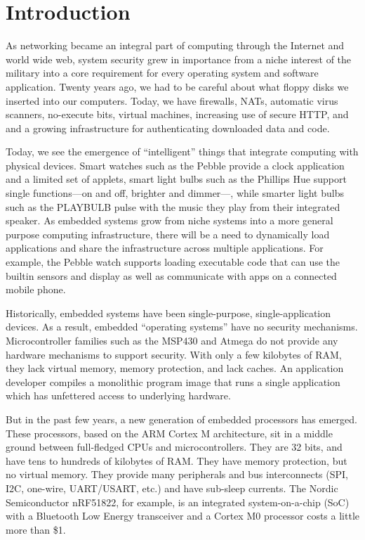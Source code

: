 \section{Introduction}

As networking became an integral part of computing through the Internet and
world wide web, system security grew in importance from a niche interest
of the military into a core requirement for every operating system and 
software application. Twenty years ago, we had to be careful about what
floppy disks we inserted into our computers. Today, we have firewalls,
NATs, automatic virus scanners, no-execute bits, virtual machines, 
increasing use of secure HTTP, and and a growing infrastructure for 
authenticating downloaded data and code.

Today, we see the emergence of ``intelligent'' things that integrate computing
with physical devices. Smart watches such as the Pebble provide a clock
application and a limited set of applets, smart light bulbs such as the
Phillips Hue support single functions---on and off, brighter and dimmer---,
while smarter light bulbs such as the PLAYBULB pulse with the music they play
from their integrated speaker.  As embedded systems grow from niche systems
into a more general purpose computing infrastructure, there will be a need to
dynamically load applications and share the infrastructure across multiple
applications.  For example, the Pebble watch supports loading executable code
that can use the builtin sensors and display as well as communicate with
apps on a connected mobile phone.

Historically,
embedded systems have been single-purpose, single-application devices.
As a result, embedded ``operating systems'' have no security mechanisms.
Microcontroller families such as the MSP430 and Atmega do not provide
any hardware mechanisms to support security. With only a few kilobytes of RAM,
they lack virtual memory, memory protection, and lack caches. 
An application developer compiles a monolithic program image that runs 
a single application which has unfettered access to underlying hardware. 

But in the past few years, a new generation of embedded processors
has emerged. These processors, based on the ARM Cortex M architecture,
sit in a middle ground between full-fledged CPUs and microcontrollers.
They are 32 bits, and have tens to hundreds of kilobytes of RAM. They have
memory protection, but no virtual memory. They provide many peripherals
and bus interconnects (SPI, I2C, one-wire, UART/USART, etc.) and
have sub-\uA sleep currents. The Nordic Semiconductor nRF51822, for example,
is an integrated system-on-a-chip (SoC) with a Bluetooth Low Energy 
transceiver and a Cortex M0 processor costs a little more than \$1.

